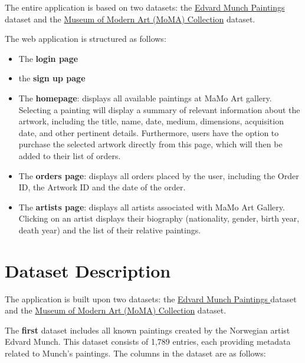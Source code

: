 \documentclass[a4paper,12pt]{article}
\begin{document}
The entire application is based on two datasets: the \href{https://www.kaggle.com/datasets/isaienkov/edvard-munch-paintings}{Edvard Munch Paintings } dataset and the \href{https://www.kaggle.com/datasets/momanyc/museum-collection?select=artworks.csv}{Museum of Modern Art (MoMA) Collection} dataset.

The web application is structured as follows:

\begin{itemize}
    \item The \textbf{login page}
    \item the \textbf{sign up page}

    \item The \textbf{homepage}: displays all available paintings at MaMo Art gallery. Selecting a painting will display a summary of relevant information about the artwork, including the title, name, date, medium, dimensions, acquisition date, and other pertinent details. Furthermore, users have the option to purchase the selected artwork directly from this page, which will then be added to their list of orders.

    \item The \textbf{orders page}: displays all orders placed by the user, including the Order ID, the Artwork ID and the date of the order.

    \item The \textbf{artists page}:  displays all artists associated with MaMo Art Gallery. Clicking on an artist displays their biography (nationality, gender, birth year, death year) and the list of their relative paintings.

\end{itemize}

\newpage
\section{Dataset Description}
\justify

The application is built upon two datasets: the \href{https://www.kaggle.com/datasets/isaienkov/edvard-munch-paintings}{Edvard Munch Paintings } dataset and the \href{https://www.kaggle.com/datasets/momanyc/museum-collection?select=artworks.csv}{Museum of Modern Art (MoMA) Collection} dataset.


The \textbf{first} dataset includes all known paintings created by the Norwegian artist Edvard Munch. This dataset consists of 1,789 entries, each providing metadata related to Munch's paintings. The columns in the dataset are as follows:
\end{document}
